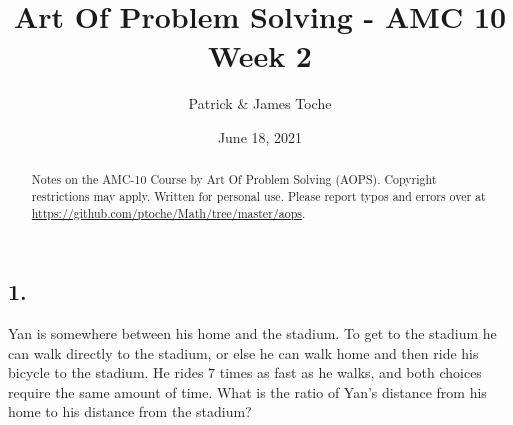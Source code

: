 \documentclass[12pt]{article}
\title{Art Of Problem Solving - AMC 10 \\ Week 2}
\author{Patrick \& James Toche}
\date{June 18, 2021}
\begin{document}
\maketitle
\begin{minipage}{\textwidth}
\begin{abstract}\setlength{\parindent}{0pt}%
Notes on the AMC-10 Course by Art Of Problem Solving (AOPS).
Copyright restrictions may apply. Written for personal use. 
Please report typos and errors over at \url{https://github.com/ptoche/Math/tree/master/aops}. 
\end{abstract}
\end{minipage}

\thispagestyle{empty}
\clearpage


\subsection*{1.}

\nopagebreak

Yan is somewhere between his home and the stadium. To get to the stadium he can walk directly to the stadium, or else he can walk home and then ride his bicycle to the stadium. He rides $7$ times as fast as he walks, and both choices require the same amount of time. What is the ratio of Yan's distance from his home to his distance from the stadium?

\nopagebreak

\end{document}

